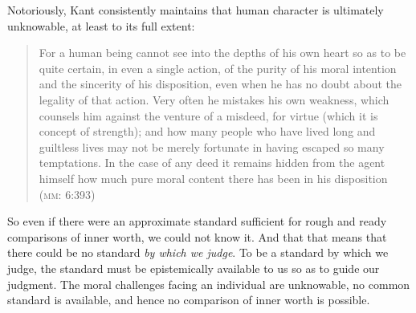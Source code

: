 \documentclass[12pt]{article}
\begin{document}

Notoriously, Kant consistently maintains that human character is ultimately unknowable, at least to its full extent:
\begin{quote}
	For a human being cannot see into the depths of his own heart so as to be quite certain, in even a single action, of the purity of his moral intention and the sincerity of his disposition, even when he has no doubt about the legality of that action. Very often he mistakes his own weakness, which counsels him against the venture of a misdeed, for virtue (which it is concept of strength); and how many people who have lived long and guiltless lives may not be merely fortunate in having escaped so many temptations. In the case of any deed it remains hidden from the agent himself how much pure moral content there has been in his disposition (\textsc{mm}: 6:393)
\end{quote}
So even if there were an approximate standard sufficient for rough and ready comparisons of inner worth, we could not know it. And that that means that there could be no standard \emph{by which we judge}. To be a standard by which we judge, the standard must be epistemically available to us so as to guide our judgment. The moral challenges facing an individual are unknowable, no common standard is available, and hence no comparison of inner worth is possible.
\end{document}
